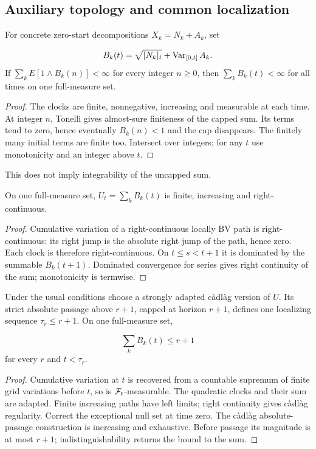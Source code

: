 \subsection{Auxiliary topology and common localization}
\begin{lemma}
For concrete zero-start decompositions $X_k=N_k+A_k$, set

\[
 B_k(t)=\sqrt{[N_k]_t}+\operatorname{Var}_{[0,t]}A_k.
\]
If $\sum_k E[1\wedge B_k(n)]<\infty$ for every integer $n\geq0$, then
$\sum_kB_k(t)<\infty$ for all times on one full-measure set.
\end{lemma}
\begin{proof}
The clocks are finite, nonnegative, increasing and measurable at each time.
At integer $n$, Tonelli gives almost-sure finiteness of the capped sum.
Its terms tend to zero, hence eventually $B_k(n)<1$ and the cap disappears.
The finitely many initial terms are finite too. Intersect over integers;
for any $t$ use monotonicity and an integer above $t$.
\end{proof}
This does not imply integrability of the uncapped sum.
\begin{lemma}
On one full-measure set, $U_t=\sum_kB_k(t)$ is finite, increasing and
right-continuous.
\end{lemma}
\begin{proof}
Cumulative variation of a right-continuous locally BV path is right-continuous:
its right jump is the absolute right jump of the path, hence zero.
Each clock is therefore right-continuous. On $t\leq s<t+1$ it is dominated
by the summable $B_k(t+1)$. Dominated convergence for series gives right
continuity of the sum; monotonicity is termwise.
\end{proof}
\begin{lemma}
Under the usual conditions choose a strongly adapted c\`adl\`ag version of
$U$. Its strict absolute passage above $r+1$, capped at horizon $r+1$, defines
one localizing sequence $\tau_r\leq r+1$. On one full-measure set,

\[
 \sum_kB_k(t)\leq r+1
\]
 for every $r$ and $t<\tau_r$.
\end{lemma}
\begin{proof}
Cumulative variation at $t$ is recovered from a countable supremum of finite
grid variations before $t$, so is $\mathcal F_t$-measurable. The quadratic clocks
and their sum are adapted. Finite increasing paths have left limits;
right continuity gives c\`adl\`ag regularity. Correct the exceptional null
set at time zero. The c\`adl\`ag absolute-passage construction is increasing
and exhaustive. Before passage its magnitude is at most $r+1$;
indistinguishability returns the bound to the sum.
\end{proof}
